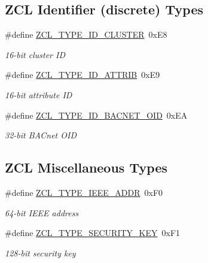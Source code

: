 \subsection*{Z\+CL Identifier (discrete) Types}
\begin{DoxyCompactItemize}
\item 
\mbox{\label{group__zcl__types_gabf44aa40c12655d86c012c551bb6834e}} 
\#define \hyperlink{group__zcl__types_gabf44aa40c12655d86c012c551bb6834e}{Z\+C\+L\+\_\+\+T\+Y\+P\+E\+\_\+\+I\+D\+\_\+\+C\+L\+U\+S\+T\+ER}~0x\+E8
\begin{DoxyCompactList}\small\item\em 16-\/bit cluster ID \end{DoxyCompactList}\item 
\mbox{\label{group__zcl__types_ga1dc09447fe0d1f047c4554975a11b3fa}} 
\#define \hyperlink{group__zcl__types_ga1dc09447fe0d1f047c4554975a11b3fa}{Z\+C\+L\+\_\+\+T\+Y\+P\+E\+\_\+\+I\+D\+\_\+\+A\+T\+T\+R\+IB}~0x\+E9
\begin{DoxyCompactList}\small\item\em 16-\/bit attribute ID \end{DoxyCompactList}\item 
\mbox{\label{group__zcl__types_ga59fe9efad9f60ec8176a13c0ab1019ac}} 
\#define \hyperlink{group__zcl__types_ga59fe9efad9f60ec8176a13c0ab1019ac}{Z\+C\+L\+\_\+\+T\+Y\+P\+E\+\_\+\+I\+D\+\_\+\+B\+A\+C\+N\+E\+T\+\_\+\+O\+ID}~0x\+EA
\begin{DoxyCompactList}\small\item\em 32-\/bit B\+A\+Cnet O\+ID \end{DoxyCompactList}\end{DoxyCompactItemize}
\subsection*{Z\+CL Miscellaneous Types}
\begin{DoxyCompactItemize}
\item 
\mbox{\label{group__zcl__types_ga13bc9499fe6127a5ce30c31f3ccae2df}} 
\#define \hyperlink{group__zcl__types_ga13bc9499fe6127a5ce30c31f3ccae2df}{Z\+C\+L\+\_\+\+T\+Y\+P\+E\+\_\+\+I\+E\+E\+E\+\_\+\+A\+D\+DR}~0x\+F0
\begin{DoxyCompactList}\small\item\em 64-\/bit I\+E\+EE address \end{DoxyCompactList}\item 
\mbox{\label{group__zcl__types_gaa430fee3f4e5e09767b9fc969f73cf2f}} 
\#define \hyperlink{group__zcl__types_gaa430fee3f4e5e09767b9fc969f73cf2f}{Z\+C\+L\+\_\+\+T\+Y\+P\+E\+\_\+\+S\+E\+C\+U\+R\+I\+T\+Y\+\_\+\+K\+EY}~0x\+F1
\begin{DoxyCompactList}\small\item\em 128-\/bit security key \end{DoxyCompactList}\end{DoxyCompactItemize}

